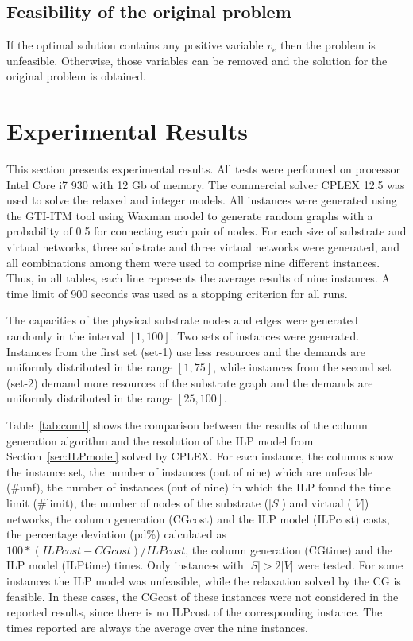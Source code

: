\documentclass[conference]{IEEEtran}
\begin{document}
\subsection{Feasibility of the original problem}
If the optimal solution contains any positive variable $v_{e}$ then the problem is unfeasible.
Otherwise, those variables can be removed and the solution for the original problem is obtained.

\section{Experimental Results}
\label{sec:results}
This section presents experimental results. All tests were performed on processor Intel Core i7 930 with 12 Gb of memory. 
The commercial solver CPLEX 12.5 was used to solve the relaxed and integer models. 
All instances were generated using the GTI-ITM tool \cite{Zagura:96} using Waxman model to generate random graphs with a probability of 0.5 for connecting each pair of nodes.
For each size of substrate and virtual networks, three substrate and three virtual networks were generated, and all combinations among them were used to comprise nine different instances. Thus, in all tables, each line represents the average results of nine instances. A time limit of 900 seconds was used as a stopping criterion for all runs.

The capacities of the physical substrate nodes and edges were generated randomly in the interval $[1,100]$.
Two sets of instances were generated. Instances from the first set (set-1) use less resources and the demands are uniformly distributed in the range $[1,75]$, while instances from the second set (set-2) demand more resources of the substrate graph and the demands are uniformly distributed in the range $[25,100]$.

Table~\ref{tab:com1} shows the comparison between the results of the column generation algorithm and the resolution of the ILP model from Section~\ref{sec:ILPmodel} solved by CPLEX.
For each instance, the columns show the instance set, the number of instances (out of nine) which are unfeasible (\#unf), the number of instances (out of nine) in which the ILP found the time limit (\#limit), the number of nodes of the substrate ($|S|$) and virtual ($|V|$) networks, the column generation (CGcost) and the ILP model (ILPcost) costs, the percentage deviation (pd\%) calculated as $100*(ILPcost-CGcost)/ILPcost$, the column generation (CGtime) and the ILP model (ILPtime) times. 
Only instances with $|S| > 2|V|$ were tested.
For some instances the ILP model was unfeasible, while the relaxation solved by the CG is feasible. 
In these cases, the CGcost of these instances were not considered in the reported results, since there is no ILPcost of the corresponding instance.
The times reported are always the average over the nine instances.
\end{document}
